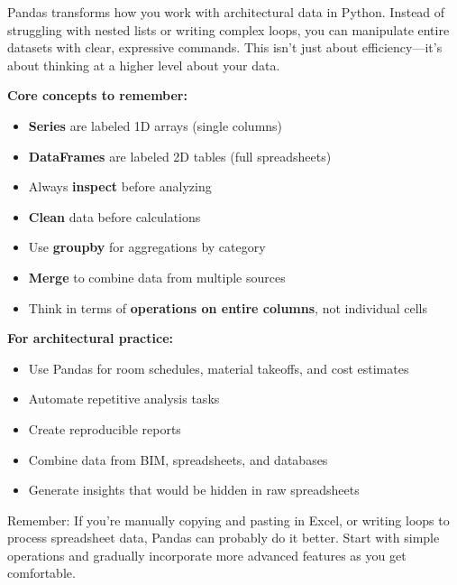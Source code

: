 \begin{tcolorbox}[
    colframe=orange,
    colback=white,
    arc=2mm
]
Pandas transforms how you work with architectural data in Python. Instead of struggling with nested lists or writing complex loops, you can manipulate entire datasets with clear, expressive commands. This isn't just about efficiency---it's about thinking at a higher level about your data.

\textbf{Core concepts to remember:}
\begin{itemize}
\item \textbf{Series} are labeled 1D arrays (single columns)
\item \textbf{DataFrames} are labeled 2D tables (full spreadsheets)
\item Always \textbf{inspect} before analyzing
\item \textbf{Clean} data before calculations
\item Use \textbf{groupby} for aggregations by category
\item \textbf{Merge} to combine data from multiple sources
\item Think in terms of \textbf{operations on entire columns}, not individual cells
\end{itemize}

\textbf{For architectural practice:}
\begin{itemize}
\item Use Pandas for room schedules, material takeoffs, and cost estimates
\item Automate repetitive analysis tasks
\item Create reproducible reports
\item Combine data from BIM, spreadsheets, and databases
\item Generate insights that would be hidden in raw spreadsheets
\end{itemize}

Remember: If you're manually copying and pasting in Excel, or writing loops to process spreadsheet data, Pandas can probably do it better. Start with simple operations and gradually incorporate more advanced features as you get comfortable.
\end{tcolorbox}